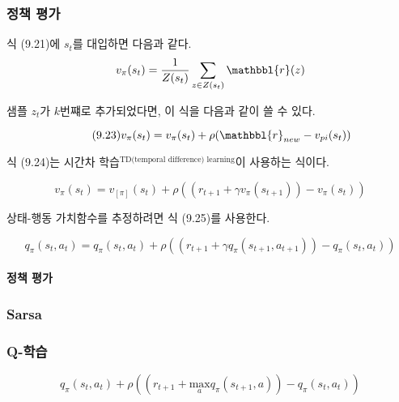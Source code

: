 \documentclass [12pt] {oblivoir}
\let\oldsubsubsection=\subsubsection
\renewcommand{\subsubsection}
{
  \filbreak
  \oldsubsubsection
}
\begin{document}
\subsubsection{정책 평가}

식 (9.21)에 $s_{t}$를 대입하면 다음과 같다.
\begin{equation*}
  v_{\pi}(s_{t}) = \frac{1}{Z(s_{t})}\sum_{z \in Z(s_t)}\mathbbl{r}(z)
\end{equation*}

샘플 $z_{t}$가 $k$번쨰로 추가되었다면, 이 식을 다음과 같이 쓸 수 있다.

\begin{equation} \tag{9.23}
  v_{\pi}(s_{t}) = v_{\pi}(s_{t}) + \rho(\mathbbl{r}_{new} - v_{pi}(s_{t}))
\end{equation}

식 (9.24)는 시간차 학습$^{\text{TD(temporal difference) learning}}$이 사용하는 식이다.

\begin{equation} \tag{9.24}
  v_{\pi}(s_{t}) = v_[\pi](s_{t}) + \rho((r_{t+1} + \gamma v_{\pi}(s_{t+1})) - v_{\pi}(s_{t}))
\end{equation}

상태-행동 가치함수를 추정하려면 식 (9.25)를 사용한다.

\begin{equation} \tag{9.25}
  q_{\pi}(s_{t}, a_{t}) = q_{\pi}(s_{t}, a_{t}) + \rho((r_{t+1} + \gamma q_{\pi}(s_{t+1}, a_{t+1})) - q_{\pi}(s_{t}, a_{t}))
\end{equation}

\paragraph*{정책 평가}\mbox{}

\vspace{3mm}

\subsubsection{Sarsa}

\subsubsection{Q-학습}

\begin{equation} \tag{9.26}
  q_{\pi}(s_{t}, a_{t}) + \rho((r_{t+1} + \underset{a}{\mathrm{max}}q_{\pi}(s_{t+1}, a)) - q_{\pi}(s_{t}, a_{t}))
\end{equation}
\end{document}

